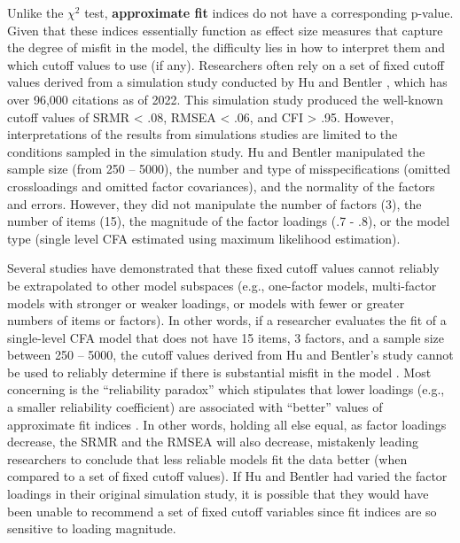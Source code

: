 \documentclass[
]{book}
\begin{document}
Unlike the \({\chi}^2\) test, \textbf{approximate fit} indices do not have a corresponding p-value. Given that these indices essentially function as effect size measures that capture the degree of misfit in the model, the difficulty lies in how to interpret them and which cutoff values to use (if any). Researchers often rely on a set of fixed cutoff values derived from a simulation study conducted by Hu and Bentler \citeyearpar{hu_cutoff_1999}, which has over 96,000 citations as of 2022. This simulation study produced the well-known cutoff values of SRMR \textless{} .08, RMSEA \textless{} .06, and CFI \textgreater{} .95. However, interpretations of the results from simulations studies are limited to the conditions sampled in the simulation study. Hu and Bentler manipulated the sample size (from 250 -- 5000), the number and type of misspecifications (omitted crossloadings and omitted factor covariances), and the normality of the factors and errors. However, they did not manipulate the number of factors (3), the number of items (15), the magnitude of the factor loadings (.7 - .8), or the model type (single level CFA estimated using maximum likelihood estimation).

Several studies have demonstrated that these fixed cutoff values cannot reliably be extrapolated to other model subspaces (e.g., one-factor models, multi-factor models with stronger or weaker loadings, or models with fewer or greater numbers of items or factors). In other words, if a researcher evaluates the fit of a single-level CFA model that does not have 15 items, 3 factors, and a sample size between 250 -- 5000, the cutoff values derived from Hu and Bentler's study cannot be used to reliably determine if there is substantial misfit in the model \citep{mcneish_dynamic_2021}. Most concerning is the ``reliability paradox'' which stipulates that lower loadings (e.g., a smaller reliability coefficient) are associated with ``better'' values of approximate fit indices \citep{hancock_reliability_2011, heene_masking_2011, marsh_search_2004, mcneish_thorny_2018, saris_testing_2009}. In other words, holding all else equal, as factor loadings decrease, the SRMR and the RMSEA will also decrease, mistakenly leading researchers to conclude that less reliable models fit the data better (when compared to a set of fixed cutoff values). If Hu and Bentler had varied the factor loadings in their original simulation study, it is possible that they would have been unable to recommend a set of fixed cutoff variables since fit indices are so sensitive to loading magnitude.
\end{document}
